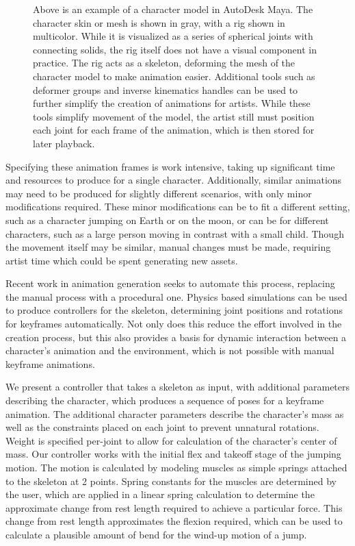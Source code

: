 \begin{figure}[htp]
\begin{subfigure}[b]{0.3\textwidth}
	\end{subfigure}
	\caption[Example of Rigged 3D Character Model]{Above is an example of a character model in AutoDesk Maya.  The character skin or mesh is shown in gray, with a rig shown in multicolor.  While it is visualized as a series of spherical joints with connecting solids, the rig itself does not have a visual component in practice.  The rig acts as a skeleton, deforming the mesh of the character model to make animation easier.  Additional tools such as deformer groups and inverse kinematics handles can be used to further simplify the creation of animations for artists.  While these tools simplify movement of the model, the artist still must position each joint for each frame of the animation, which is then stored for later playback.}
\end{figure}

Specifying these animation frames is work intensive, taking up significant time and resources to produce for a single character.  Additionally, similar animations may need to be produced for slightly different scenarios, with only minor modifications required.  These minor modifications can be to fit a different setting, such as a character jumping on Earth or on the moon, or can be for different characters, such as a large person moving in contrast with a small child.  Though the movement itself may be similar, manual changes must be made, requiring artist time which could be spent generating new assets.  

Recent work in animation generation seeks to automate this process, replacing the manual process with a procedural one.  Physics based simulations can be used to produce controllers for the skeleton, determining joint positions and rotations for keyframes automatically.  Not only does this reduce the effort involved in the creation process, but this also provides a basis for dynamic interaction between a character's animation and the environment, which is not possible with manual keyframe animations.

We present a controller that takes a skeleton as input, with additional parameters describing the character, which produces a sequence of poses for a keyframe animation.  The additional character parameters describe the character's mass as well as the constraints placed on each joint to prevent unnatural rotations.  Weight is specified per-joint to allow for calculation of the character's center of mass.  Our controller works with the initial flex and takeoff stage of the jumping motion.  The motion is calculated by modeling muscles as simple springs attached to the skeleton at 2 points.  Spring constants for the muscles are determined by the user, which are applied in a linear spring calculation to determine the approximate change from rest length required to achieve a particular force.  This change from rest length approximates the flexion required, which can be used to calculate a plausible amount of bend for the wind-up motion of a jump.

